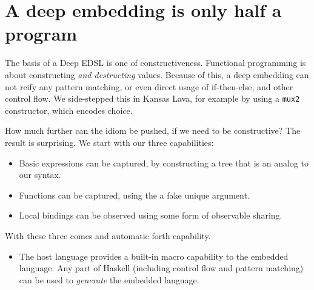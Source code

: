 \documentclass[11pt]{article}
\begin{document}
\section{A deep embedding is only half a program}

The basis of a Deep EDSL is one of constructiveness.
Functional programming is about constructing {\em and destructing\/} values.
Because of this, a deep embedding can not reify any pattern matching, 
or even direct usage of if-then-else, and other control flow. We side-stepped this
in Kansas Lava, for example by using a \verb|mux2| constructor, 
which encodes choice.

How much further can the idiom be pushed, if we need to be constructive?
The result is surprising. We start with our three capabilities:
\begin{itemize}
\item Basic expressions can be captured, by constructing a tree that is an analog to our syntax.
\item Functions can be captured, using the a fake unique argument.
\item Local bindings can be observed using some form of observable sharing.
\end{itemize}
With these three comes and automatic forth capability.
\begin{itemize}
\item The host language provides a built-in macro capability to the embedded language.
Any part of Haskell (including control flow and pattern matching) can be used
to {\em generate\/} the embedded language. 
\end{itemize}
\end{document}
